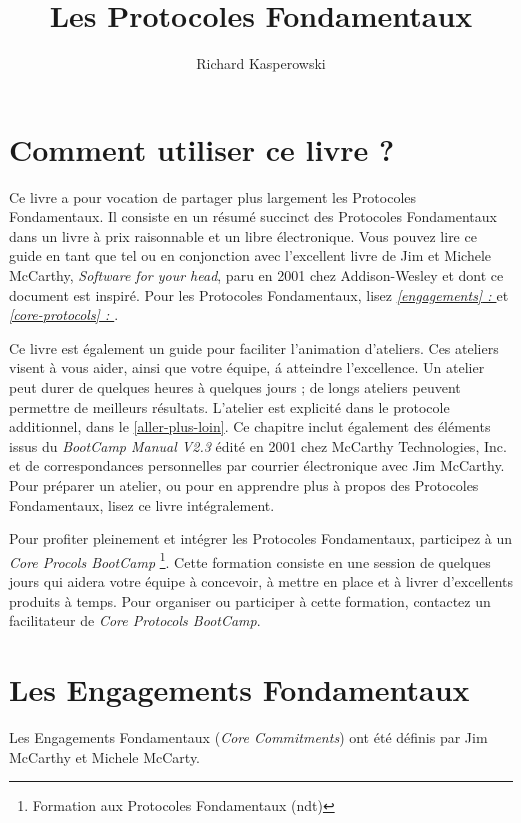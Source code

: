 \documentclass{book}
\author{Richard Kasperowski}
\title{Les Protocoles Fondamentaux}
\newcommand*{\numref}[1]{{\hyperref[{#1}]{\autoref*{#1}}}}
\newcommand*{\fullref}[1]{\textit{\hyperref[{#1}]{\autoref*{#1} : \nameref*{#1}}}}
\begin{document}
\tableofcontents

\chapter{Comment utiliser ce livre ?} \label{utiliser-ce-livre}

Ce livre a pour vocation de partager plus largement les Protocoles Fondamentaux. Il consiste en un résumé succinct des 
Protocoles Fondamentaux dans un livre à prix raisonnable et un libre électronique. Vous pouvez lire ce guide en tant que 
tel ou en conjonction avec l'excellent livre de Jim et Michele McCarthy, \emph{Software for your head}, paru en 2001
chez Addison-Wesley et dont ce document est inspiré. Pour les Protocoles Fondamentaux, lisez \fullref{engagements} et 
\fullref{core-protocols}. 

Ce livre est également un guide pour faciliter l'animation d'ateliers. Ces ateliers visent à vous aider, ainsi que 
votre équipe, á atteindre l'excellence. Un atelier peut durer de quelques heures à quelques jours ; de longs ateliers
peuvent permettre de meilleurs résultats. L'atelier est explicité dans le protocole additionnel, 
dans le \numref{aller-plus-loin}. Ce chapitre inclut également des éléments issus du \emph{BootCamp Manual V2.3} édité en 
2001 chez McCarthy Technologies, Inc. et de correspondances personnelles par courrier électronique avec Jim McCarthy. Pour 
préparer un atelier, ou pour en apprendre plus à propos des Protocoles Fondamentaux, lisez ce livre intégralement. 

Pour profiter pleinement et intégrer les Protocoles Fondamentaux, participez à un \emph{Core Procols BootCamp}
\footnote{Formation aux Protocoles Fondamentaux (ndt)}. Cette formation consiste en une session de quelques jours qui aidera
votre équipe à concevoir, à mettre en place et à livrer d'excellents produits à temps. Pour organiser ou participer à cette
formation, contactez un facilitateur de \emph{Core Protocols BootCamp}.

\chapter{Les Engagements Fondamentaux} \label{engagements}

Les Engagements Fondamentaux (\emph{Core Commitments}) ont été définis par Jim McCarthy et Michele McCarty. 
\end{document}
